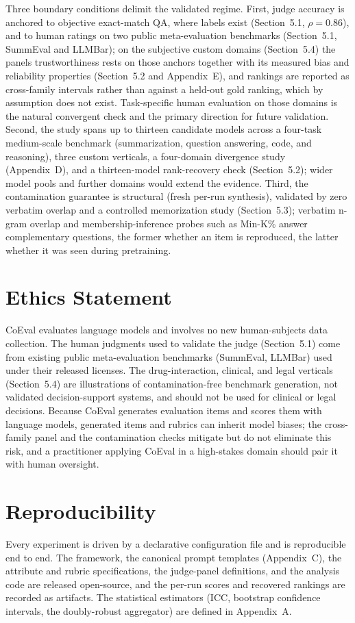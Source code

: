 Three boundary conditions delimit the validated regime. First, judge accuracy is anchored to objective exact-match QA,
where labels exist (Section~5.1, \(\rho = 0.86\)), and to human ratings on two public meta-evaluation benchmarks
(Section~5.1, SummEval and LLMBar); on the subjective custom domains (Section~5.4) the panel\textquotesingle s trustworthiness
rests on those anchors together with its measured bias and reliability properties (Section~5.2 and Appendix~E), and
rankings are reported as cross-family intervals rather than against a held-out gold ranking, which by assumption does
not exist. Task-specific human evaluation on those domains is the natural convergent check and the primary direction for
future validation. Second, the study spans up to thirteen candidate models across a four-task medium-scale benchmark
(summarization, question answering, code, and reasoning), three
custom verticals, a four-domain divergence study (Appendix~D), and a thirteen-model rank-recovery check
(Section~5.2); wider model pools and further domains would extend the evidence. Third, the contamination guarantee
is structural (fresh per-run synthesis), validated by zero verbatim overlap and a controlled memorization study
(Section~5.3); verbatim n-gram overlap and membership-inference probes such as Min-K\% \citep{ref36}
answer complementary questions, the former whether an item is reproduced, the latter whether it was seen during
pretraining.

\section*{Ethics Statement}\label{ethics-statement}

CoEval evaluates language models and involves no new human-subjects data collection. The human judgments used to
validate the judge (Section~5.1) come from existing public meta-evaluation benchmarks (SummEval, LLMBar) used
under their released licenses. The drug-interaction, clinical, and legal verticals (Section~5.4) are illustrations
of contamination-free benchmark generation, not validated decision-support systems, and should not be used for clinical
or legal decisions. Because CoEval generates evaluation items and scores them with language models, generated items and
rubrics can inherit model biases; the cross-family panel and the contamination checks mitigate but do not eliminate this
risk, and a practitioner applying CoEval in a high-stakes domain should pair it with human oversight.

\section*{Reproducibility}\label{reproducibility}

Every experiment is driven by a declarative configuration file and is reproducible end to end. The framework, the
canonical prompt templates (Appendix~C), the attribute and rubric specifications, the judge-panel definitions, and
the analysis code are released open-source, and the per-run scores and recovered rankings are recorded as artifacts. The
statistical estimators (ICC, bootstrap confidence intervals, the doubly-robust aggregator) are defined in
Appendix~A.

